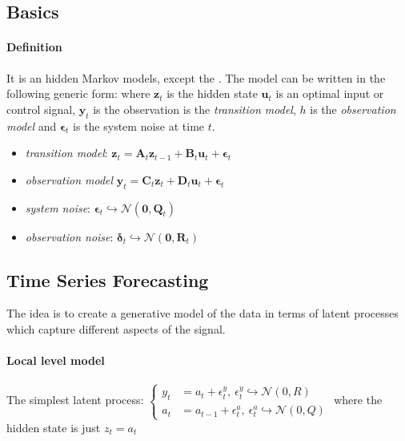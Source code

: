 \subsection{Basics}
\paragraph{Definition}
It is an hidden Markov models, except the .
The model can be written in the following generic form: 
where $\bm{z}_{t}$ is the hidden state $\bm{u}_{t}$ is an optimal input or control signal, $\bm{y}_{
t}$ is the observation is the \emph{transition model}, $h$ is the \emph{observation model} and $\bm{
\epsilon}_{t}$ is the system noise at time $t$.
\begin{itemize}
    \item \emph{transition model}: $\bm{z}_{t} = \bm{A}_{t}\bm{z}_{t-1} + \bm{B}_{t}\bm{u}_{t} +
        \bm{\epsilon}_{t}$
    \item \emph{observation model} $\bm{y}_{t} = \bm{C}_{t}\bm{z}_{t} + \bm{D}_{t}\bm{u}_{t} + \bm{
        \epsilon}_{t}$
    \item \emph{system noise}: $\bm{\epsilon}_{t}\hookrightarrow \mathcal{N}(\bm{0}, \bm{Q}_{t})$
    \item \emph{observation noise}: $\bm{\delta}_{t}\hookrightarrow \mathcal{N}(\bm{0}, \bm{R}_{t})$
\end{itemize}

\subsection{Time Series Forecasting}
The idea is to create a generative model of the data in terms of latent processes which capture 
different aspects of the signal.

\paragraph{Local level model}
The simplest latent process:
$\begin{cases}
    y_{t} &= a_{t} + \epsilon^{y}_{t},~\epsilon^{y}_{t}\hookrightarrow \mathcal{N}(0, R)\\
    a_{t} &= a_{t-1} + \epsilon^{a}_{t},~\epsilon^{a}_{t}\hookrightarrow \mathcal{N}(0, Q)
\end{cases}$
where the hidden state is just $z_{t}=a_{t}$
